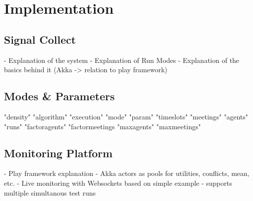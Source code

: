 \chapter{Implementation}

\section{Signal Collect}

- Explanation of the system
- Explanation of Run Modes
- Explanation of the basics behind it (Akka -> relation to play framework)

\section{Modes \& Parameters}

"density"
"algorithm"
"execution"
"mode"
"param"
"timeslots"
"meetings"
"agents"
"runs"
"factoragents"
"factormeetings
"maxagents"
"maxmeetings"


\section{Monitoring Platform}

- Play framework explanation
- Akka actors as pools for utilities, conflicts, mean, etc.
- Live monitoring with Websockets based on simple example
- supports multiple simultanous test runs